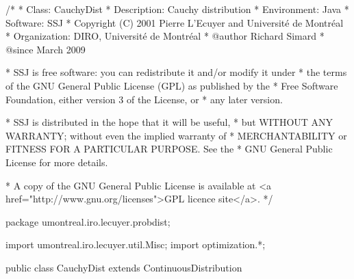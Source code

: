 \begin{code}\begin{hide}
/*
 * Class:        CauchyDist
 * Description:  Cauchy distribution
 * Environment:  Java
 * Software:     SSJ 
 * Copyright (C) 2001  Pierre L'Ecuyer and Université de Montréal
 * Organization: DIRO, Université de Montréal
 * @author       Richard Simard
 * @since        March 2009

 * SSJ is free software: you can redistribute it and/or modify it under
 * the terms of the GNU General Public License (GPL) as published by the
 * Free Software Foundation, either version 3 of the License, or
 * any later version.

 * SSJ is distributed in the hope that it will be useful,
 * but WITHOUT ANY WARRANTY; without even the implied warranty of
 * MERCHANTABILITY or FITNESS FOR A PARTICULAR PURPOSE.  See the
 * GNU General Public License for more details.

 * A copy of the GNU General Public License is available at
   <a href="http://www.gnu.org/licenses">GPL licence site</a>.
 */
\end{hide}
package umontreal.iro.lecuyer.probdist;
\begin{hide}
import umontreal.iro.lecuyer.util.Misc;
import optimization.*;
\end{hide}

public class CauchyDist extends ContinuousDistribution\begin{hide} {
   private double alpha;
   private double beta;

   private static class Optim implements Uncmin_methods
   {
      private int n;
      private double[] xi;

      public Optim (double[] x, int n)
      {
         this.n = n;
         this.xi = new double[n];
         System.arraycopy (x, 0, this.xi, 0, n);
      }

      public double f_to_minimize (double[] p)
      {
         double sum = 0.0;

         if (p[2] <= 0.0)               // barrier at 0
            return 1.0e200;

         for (int i = 0; i < n; i++)
            sum -= Math.log (density (p[1], p[2], xi[i]));

         return sum;
      }

      public void gradient (double[] x, double[] g)
      {
      }

      public void hessian (double[] x, double[][] h)
      {
      }
   }
\end{hide}
\end{code}
